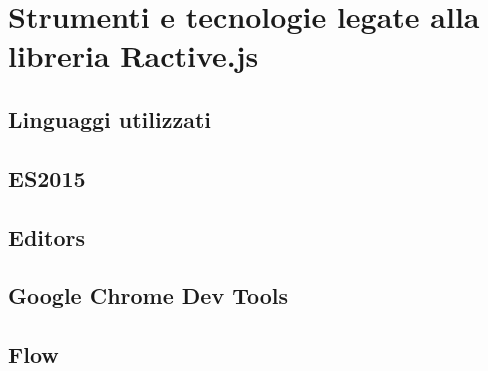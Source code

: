 
\chapter{Strumenti e tecnologie legate alla libreria Ractive.js}
\label{cap:strumenti-tecnologie}
\section{Linguaggi utilizzati}

\section{ES2015}

\section{Editors}

\section{Google Chrome Dev Tools}\label{sec:chrome}

\section{Flow}

